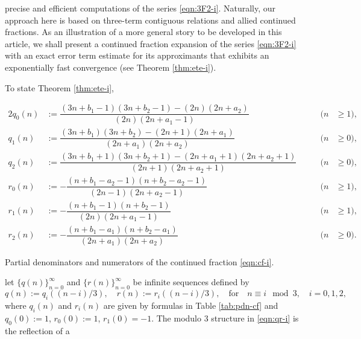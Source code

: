 \documentclass[a4paper,12pt]{article}
\theoremstyle{plain}
\begin{document}
precise and efficient computations of the series \eqref{eqn:3F2-i}. 
Naturally, our approach here is based on three-term contiguous 
relations and allied continued fractions. 
As an illustration of a more general story to be developed in this 
article, we shall present a continued fraction expansion of the 
series \eqref{eqn:3F2-i} with an exact error term estimate 
for its approximants that exhibits an exponentially fast convergence 
(see Theorem \ref{thm:ete-i}).     
\par
To state Theorem \ref{thm:ete-i},  
\begin{table}[t]
\begin{alignat*}{2} %
q_0(n) &:= \dfrac{(3 n+b_1-1)(3 n+b_2-1)-(2 n)(2 n+ a_2)}{(2 n)(2 n + a_1 -1)} 
\qquad & (n &\ge 1),  \\[2mm]
q_1(n) &:= \dfrac{(3 n + b_1)(3 n + b_2)-(2 n+1)(2 n+ a_1)}{(2 n + a_1)(2 n + a_2)} 
\qquad & (n &\ge 0),  \\[2mm]
q_2(n) &:= 
\dfrac{(3 n+b_1+1)(3 n+ b_2+1)-(2 n+ a_1+1)(2 n+ a_2+1)}{(2 n+1)(2 n + a_2 + 1)} 
\qquad & (n &\ge 0),  \\[2mm] 
r_0(n) &:= - \dfrac{(n+b_1-a_2-1)(n+b_2-a_2-1)}{(2 n-1)(2 n+a_2-1)} 
\qquad & (n &\ge 1), \\[2mm]
r_1(n) &:= - \dfrac{(n+b_1-1)(n+b_2-1)}{(2 n)(2 n+a_1-1)} 
\qquad & (n &\ge 1),  \\[2mm]
r_2(n) &:= - \dfrac{(n+b_1-a_1)(n+b_2-a_1)}{(2 n+a_1)(2 n+a_2)} 
\qquad & (n &\ge 0).   
\end{alignat*}
\caption{Partial denominators and numerators of the continued 
fraction \eqref{eqn:cf-i}.} 
\label{tab:pdn-cf}
\end{table} 
let $\{q(n)\}_{n=0}^{\infty}$ and $\{r(n)\}_{n=0}^{\infty}$ be infinite sequences 
defined by    
\begin{equation} \label{eqn:qr-i} 
q(n) := q_i((n-i)/3), \quad r(n) := r_i((n-i)/3), \quad \mbox{for} \quad 
n \equiv i \mod 3, \quad i = 0, 1, 2,     
\end{equation}
where $q_i(n)$ and $r_i(n)$ are given by formulas in Table \ref{tab:pdn-cf} 
and $q_0(0) := 1$, $r_0(0) := 1$, $r_1(0) = -1$.  
The modulo $3$ structure in \eqref{eqn:qr-i} is the reflection of a 
\end{document}
